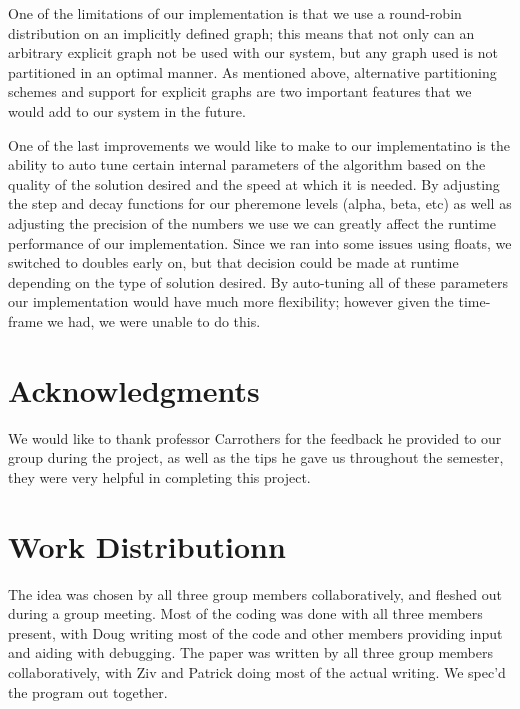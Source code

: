 \documentclass{acm_proc_article-sp}
\begin{document}
One of the limitations of our implementation is that we use a round-robin distribution on an implicitly defined graph; 
this means that not only can an arbitrary explicit graph not be used with our system, but any graph used is not partitioned
in an optimal manner. As mentioned above, alternative partitioning schemes and support for explicit graphs are two important features that we would add to our system in the future.

One of the last improvements we would like to make to our implementatino is the ability to auto tune certain internal parameters
of the algorithm based on the quality of the solution desired and the speed at which it is needed. By adjusting the step and decay functions for our pheremone levels (alpha, beta, etc) as well as adjusting the precision of the numbers we use we can greatly affect the runtime performance of our implementation. Since we ran into some issues using floats, we switched to doubles early on, but that decision could be made at runtime depending on the type of solution desired. By auto-tuning all of these parameters our implementation would have much more flexibility; however given the time-frame we had, we were unable to do this.

\section{Acknowledgments}
We would like to thank professor Carrothers for the feedback he provided to 
our group during the project, as well as the tips he gave us throughout the
semester, they were very helpful in completing this project.

\section{Work Distributionn}
The idea was chosen by all three group members collaboratively, and fleshed out 
during a group meeting. Most of the coding was done with all three members present,
with Doug writing most of the code and other members providing input and aiding with
debugging. The paper was written by all three group members collaboratively, with Ziv
and Patrick doing most of the actual writing. We spec'd the program out together.


\balancecolumns
\end{document}
